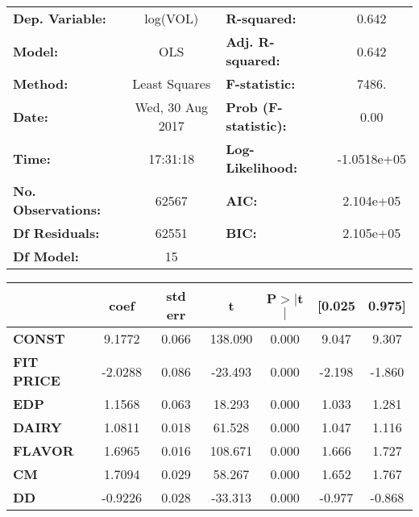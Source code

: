 \documentclass{article}
\begin{document}
\begin{center}
\begin{tabular}{lclc}
\toprule
\textbf{Dep. Variable:}    &        log(VOL)         & \textbf{  R-squared:         } &      0.642   \\
\textbf{Model:}            &       OLS        & \textbf{  Adj. R-squared:    } &      0.642   \\
\textbf{Method:}           &  Least Squares   & \textbf{  F-statistic:       } &      7486.   \\
\textbf{Date:}             & Wed, 30 Aug 2017 & \textbf{  Prob (F-statistic):} &      0.00    \\
\textbf{Time:}             &     17:31:18     & \textbf{  Log-Likelihood:    } & -1.0518e+05  \\
\textbf{No. Observations:} &       62567      & \textbf{  AIC:               } &  2.104e+05   \\
\textbf{Df Residuals:}     &       62551      & \textbf{  BIC:               } &  2.105e+05   \\
\textbf{Df Model:}         &          15      & \textbf{                     } &              \\
\bottomrule
\end{tabular}
\begin{tabular}{lcccccc}
               & \textbf{coef} & \textbf{std err} & \textbf{t} & \textbf{P$>$$|$t$|$} & \textbf{[0.025} & \textbf{0.975]}  \\
\midrule
\textbf{CONST} &       9.1772  &        0.066     &   138.090  &         0.000        &        9.047    &        9.307     \\
\textbf{FIT PRICE}    &      -2.0288  &        0.086     &   -23.493  &         0.000        &       -2.198    &       -1.860     \\
\textbf{EDP}    &       1.1568  &        0.063     &    18.293  &         0.000        &        1.033    &        1.281     \\
\textbf{DAIRY}    &       1.0811  &        0.018     &    61.528  &         0.000        &        1.047    &        1.116     \\
\textbf{FLAVOR}    &       1.6965  &        0.016     &   108.671  &         0.000        &        1.666    &        1.727     \\
\textbf{CM}    &       1.7094  &        0.029     &    58.267  &         0.000        &        1.652    &        1.767     \\
\textbf{DD}    &      -0.9226  &        0.028     &   -33.313  &         0.000        &       -0.977    &       -0.868     \\

\end{tabular}
\end{center}
\end{document}
